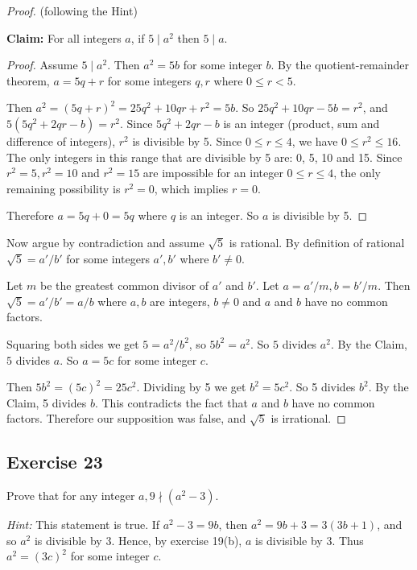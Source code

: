 \documentclass[14pt]{extarticle}
\begin{document}
\begin{proof}
(following the Hint)

{\bf Claim:} For all integers $a$, if $5 \mid a^2$ then $5 \mid a$.

\begin{proof}
Assume $5 \mid a^2$. Then $a^2 = 5b$ for some integer $b$. By the quotient-remainder theorem, $a = 5q+r$ for some integers $q,r$ where $0 \leq r < 5$.

Then $a^2 = (5q+r)^2 = 25q^2 + 10qr + r^2 = 5b$. So $25q^2 + 10qr - 5b = r^2$, and $5(5q^2 + 2qr - b) = r^2$. Since $5q^2 + 2qr - b$ is an integer (product, sum and difference of integers), $r^2$ is divisible by 5. Since $0 \leq r \leq 4$, we have $0 \leq r^2 \leq 16$. The only integers in this range that are divisible by 5 are: 0, 5, 10 and 15. Since $r^2 = 5, r^2 = 10$ and $r^2 = 15$ are impossible for an integer $0 \leq r \leq 4$, the only remaining possibility is $r^2 = 0$, which implies $r = 0$.

Therefore $a = 5q + 0 = 5q$ where $q$ is an integer. So $a$ is divisible by 5.
\end{proof}

Now argue by contradiction and assume $\sqrt{5}$ is rational. By definition of rational $\sqrt{5} = a'/b'$ for some integers $a', b'$ where $b' \neq 0$.

Let $m$ be the greatest common divisor of $a'$ and $b'$. Let $a = a'/m, b = b'/m$. Then $\sqrt{5} = a'/b' = a/b$ where $a,b$ are integers, $b \neq 0$ and $a$ and $b$ have no common factors.

Squaring both sides we get $5 = a^2 / b^2$, so $5b^2 = a^2$. So $5$ divides $a^2$. By the Claim, $5$ divides $a$. So $a = 5c$ for some integer $c$.

Then $5b^2 = (5c)^2 = 25c^2$. Dividing by 5 we get $b^2 = 5c^2$. So 5 divides $b^2$. By the Claim, 5 divides $b$. This contradicts the fact that $a$ and $b$ have no common factors. Therefore our supposition was false, and $\sqrt{5}$ is irrational.
\end{proof}

\subsection{Exercise 23}
Prove that for any integer $a, 9 \nmid (a^2 - 3).$

{\it Hint:} This statement is true. If $a^2 - 3 = 9b$, then
$a^2 = 9b + 3 = 3(3b + 1)$, and so $a^2$ is divisible by 3.
Hence, by exercise 19(b), $a$ is divisible by 3. Thus
$a^2 = (3c)^2$ for some integer $c$.
\end{document}
